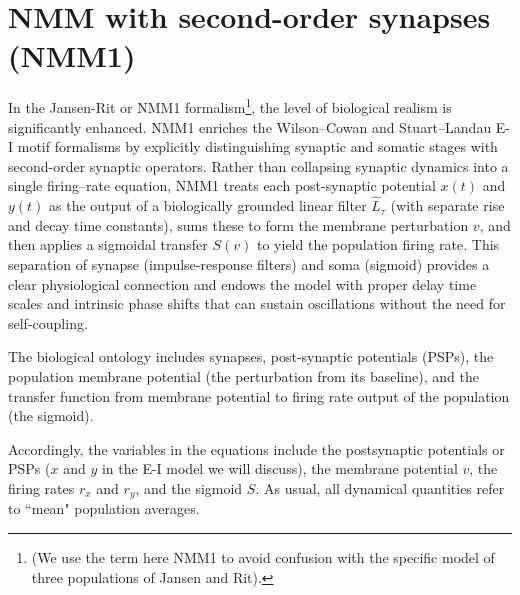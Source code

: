 \documentclass[12pt]{article}
\numberwithin{equation}{section}
\begin{document}
\section{NMM with second-order synapses (NMM1)} \label{sec:NMM1}
\begin{tcolorbox}[colback=gray!6,colframe=gray!6,enlarge left by=0mm, boxrule=0pt, enhanced, sharp corners]
In the Jansen-Rit or NMM1 formalism\footnote{(We use the term here NMM1 to avoid confusion with the specific model of three populations of Jansen and Rit).}, the level of biological realism is significantly enhanced. 
NMM1 enriches the Wilson–Cowan and Stuart–Landau E-I motif formalisms by explicitly distinguishing synaptic and somatic stages with second-order synaptic operators.  Rather than collapsing synaptic dynamics into a single firing–rate equation, NMM1 treats each post-synaptic potential $x(t)$ and $y(t)$ as the output of a biologically grounded linear filter $\hat L_{\tau}$ (with separate rise and decay time constants), sums these to form the membrane perturbation $v$, and then applies a sigmoidal transfer $S(v)$ to yield the population firing rate.  This separation of synapse (impulse-response filters) and soma (sigmoid)  provides a clear physiological connection and endows the model with proper delay time scales and intrinsic phase shifts that can sustain oscillations without the need for self-coupling.

 The biological ontology includes synapses, post-synaptic potentials (PSPs), the population membrane potential (the perturbation from its baseline), and the transfer function from membrane potential to firing rate output of the population (the sigmoid).


Accordingly, the variables in the equations include the postsynaptic potentials or PSPs ($x$ and $y$ in the E-I model we will discuss), the membrane potential $v$, the firing rates $r_x$ and $r_y$, and the sigmoid $S$.  As usual, all dynamical quantities refer to  ``mean" population averages. 
\end{tcolorbox}
\end{document}
